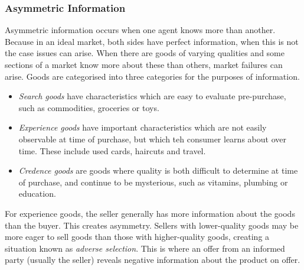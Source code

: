 \documentclass[12pt]{report}
\begin{document}
\subsubsection*{Asymmetric Information}
Asymmetric information occurs when one agent knows more than another.
Because in an ideal market, both sides have perfect information, when
this is not the case issues can arise. When there are goods of varying
qualities and some sections of a market know more about these than others, 
market failures can arise. Goods are categorised into three categories
for the purposes of information.
\begin{itemize}
    \item \textit{Search goods} have characteristics which are easy to
    evaluate pre-purchase, such as commodities, groceries or toys.
    \item \textit{Experience goods} have important characteristics which
    are not easily observable at time of purchase, but which teh consumer
    learns about over time. These include used cards, haircuts and travel.
    \item \textit{Credence goods} are goods where quality is both difficult
    to determine at time of purchase, and continue to be mysterious, such as
    vitamins, plumbing or education.
\end{itemize}
For experience goods, the seller generally has more information about the
goods than the buyer. This creates asymmetry. Sellers with lower-quality 
goods may be more eager to sell goods than those with higher-quality goods,
creating a situation known as \textit{adverse selection}. This is where an
offer from an informed party (usually the seller) reveals negative information
about the product on offer.
\end{document}
